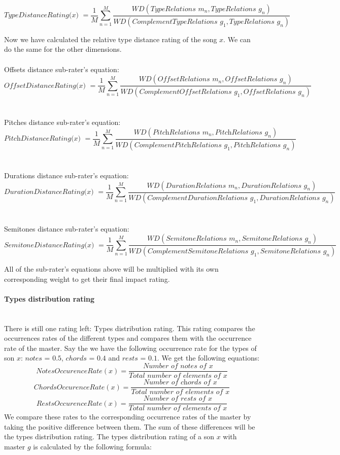 \documentclass[a4paper]{article}
\begin{document}
\[ \textit{TypeDistanceRating($x$) } =  \frac{1}{M}\sum_{n=1}^{M}
\frac{WD(\textit{TypeRelations $m_n$},\textit{TypeRelations $g_n$})} {WD(\textit{ComplementTypeRelations $g_1$},\textit{TypeRelations $g_n$})} \]

Now we have calculated the relative type distance rating of the song $x$. We can do the same for the other dimensions.\\\\
Offsets distance sub-rater's equation:
\[ \textit{OffsetDistanceRating($x$) } =  \frac{1}{M}\sum_{n=1}^{M}
\frac{WD(\textit{OffsetRelations $m_n$},\textit{OffsetRelations $g_n$})} {WD(\textit{ComplementOffsetRelations $g_1$},\textit{OffsetRelations $g_n$})} \]
\\\\
Pitches distance sub-rater's equation:
\[ \textit{PitchDistanceRating($x$) } =  \frac{1}{M}\sum_{n=1}^{M}
\frac{WD(\textit{PitchRelations $m_n$},\textit{PitchRelations $g_n$})} {WD(\textit{ComplementPitchRelations $g_1$},\textit{PitchRelations $g_n$})} \]
\\\\
Durations distance sub-rater's equation:
\[ \textit{DurationDistanceRating($x$) } =  \frac{1}{M}\sum_{n=1}^{M}
\frac{WD(\textit{DurationRelations $m_n$},\textit{DurationRelations $g_n$})} {WD(\textit{ComplementDurationRelations $g_1$},\textit{DurationRelations $g_n$})} \]
\\\\
Semitones distance sub-rater's equation:
\[ \textit{SemitoneDistanceRating($x$) } =  \frac{1}{M}\sum_{n=1}^{M}
\frac{WD(\textit{SemitoneRelations $m_n$},\textit{SemitoneRelations $g_n$})} {WD(\textit{ComplementSemitoneRelations $g_1$},\textit{SemitoneRelations $g_n$})} \]

All of the sub-rater's equations above will be multiplied with its own corresponding weight to get their final impact rating.

\paragraph{Types distribution rating}\mbox{}\\
There is still one rating left: Types distribution rating. This rating compares the occurrences rates of the different types and compares them with the occurrence rate of the master. Say the we have the following occurrence rate for the types of son $x$: $notes$ = $0.5$, $chords$ = $0.4$ and $rests$ = $0.1$. We get the following equations: 
\[ NotesOccurenceRate(x) = \frac{\textit{Number of notes of x}}{\textit{Total number of elements of x} } \]
\[ ChordsOccurenceRate(x) = \frac{\textit{Number of chords of x}}{\textit{Total number of elements of x} } \]
\[ RestsOccurenceRate(x) = \frac{\textit{Number of rests of x}}{\textit{Total number of elements of x} } \]
We compare these rates to the corresponding occurrence rates of the master by taking the positive difference between them. The sum of these differences will be the types distribution rating. The types distribution rating of a son $x$ with master $g$ is calculated by the following formula:
\end{document}
